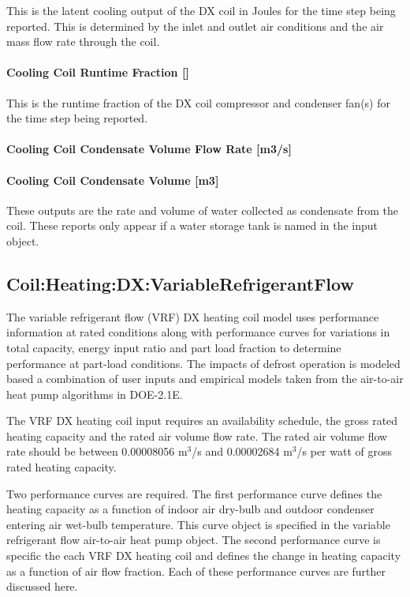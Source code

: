 This is the latent cooling output of the DX coil in Joules for the time step being reported. This is determined by the inlet and outlet air conditions and the air mass flow rate through the coil.

\paragraph{Cooling Coil Runtime Fraction {[]}}\label{cooling-coil-runtime-fraction}

This is the runtime fraction of the DX coil compressor and condenser fan(s) for the time step being reported.

\paragraph{Cooling Coil Condensate Volume Flow Rate {[}m3/s{]}}\label{cooling-coil-condensate-volume-flow-rate-m3s-1}

\paragraph{Cooling Coil Condensate Volume {[}m3{]}}\label{cooling-coil-condensate-volume-m3-1}

These outputs are the rate and volume of water collected as condensate from the coil. These reports only appear if a water storage tank is named in the input object.

\subsection{Coil:Heating:DX:VariableRefrigerantFlow}\label{coilheatingdxvariablerefrigerantflow}

The variable refrigerant flow (VRF) DX heating coil model uses performance information at rated conditions along with performance curves for variations in total capacity, energy input ratio and part load fraction to determine performance at part-load conditions. The impacts of defrost operation is modeled based a combination of user inputs and empirical models taken from the air-to-air heat pump algorithms in DOE-2.1E.

The VRF DX heating coil input requires an availability schedule, the gross rated heating capacity and the rated air volume flow rate. The rated air volume flow rate should be between 0.00008056 m\(^{3}\)/s and 0.00002684 m\(^{3}\)/s per watt of gross rated heating capacity.

Two performance curves are required. The first performance curve defines the heating capacity as a function of indoor air dry-bulb and outdoor condenser entering air wet-bulb temperature. This curve object is specified in the variable refrigerant flow air-to-air heat pump object. The second performance curve is specific the each VRF DX heating coil and defines the change in heating capacity as a function of air flow fraction. Each of these performance curves are further discussed here.

